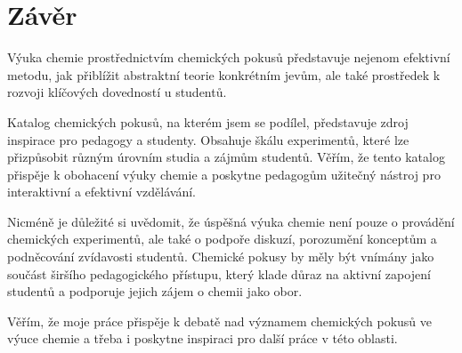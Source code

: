 \newpage
\chapter*{Závěr}

Výuka chemie prostřednictvím chemických pokusů představuje nejenom efektivní metodu, jak přiblížit abstraktní teorie konkrétním jevům, ale také prostředek k rozvoji klíčových dovedností u studentů.

Katalog chemických pokusů, na kterém jsem se podílel, představuje zdroj inspirace pro pedagogy a studenty. Obsahuje škálu experimentů, které lze přizpůsobit různým úrovním studia a zájmům studentů. Věřím, že tento katalog přispěje k obohacení výuky chemie a poskytne pedagogům užitečný nástroj pro interaktivní a efektivní vzdělávání.

Nicméně je důležité si uvědomit, že úspěšná výuka chemie není pouze o provádění chemických experimentů, ale také o podpoře diskuzí, porozumění konceptům a podněcování zvídavosti studentů. Chemické pokusy by měly být vnímány jako součást širšího pedagogického přístupu, který klade důraz na aktivní zapojení studentů a podporuje jejich zájem o chemii jako obor.

Věřím, že moje práce přispěje k debatě nad významem chemických pokusů ve výuce chemie a třeba i poskytne inspiraci pro další práce v této oblasti.
